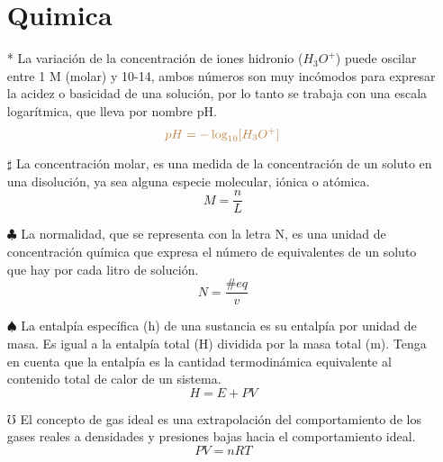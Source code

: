 \documentclass[4apaper, 12pt]{article}
\begin{document}
\begin{itemize}
    \section{Quimica}
    \item [*] La variación de la concentración de iones hidronio ($H_3O^+$) puede oscilar entre 1 M (molar) y 10-14, ambos números son muy incómodos para expresar la acidez o basicidad de una solución, por lo tanto se trabaja con una escala logarítmica, que lleva por nombre pH.
    \begin{equation*}
       \textcolor{brown}{pH=-\log_{10}[H_3O^+]}
    \end{equation*}
      \item[$\sharp$]La concentración molar, es una medida de la concentración de un soluto en una disolución, ya sea alguna especie molecular, iónica o atómica.
      \[M=\frac{n}{L}\]
     \item[$\clubsuit$] La normalidad, que se representa con la letra N, es una unidad de concentración química que expresa el número de equivalentes de un soluto que hay por cada litro de solución.
     $$N=\frac{\#eq}{v}$$
      \item[$\spadesuit$] La entalpía específica (h) de una sustancia es su entalpía por unidad de masa. Es igual a la entalpía total (H) dividida por la masa total (m). Tenga en cuenta que la entalpía es la cantidad termodinámica equivalente al contenido total de calor de un sistema.
      $$H=E+PV$$
      \item[$\mho$] El concepto de gas ideal es una extrapolación del comportamiento de los gases reales a densidades y presiones bajas hacia el comportamiento ideal.
      $$PV=nRT$$
\end{itemize}
\end{document}
